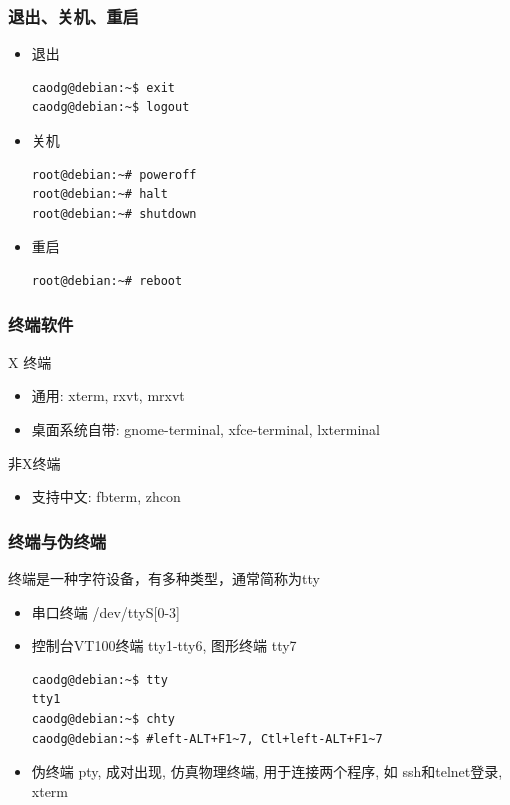 \documentclass[compress]{beamer}
\begin{document}
\begin{frame}[containsverbatim]
\frametitle{退出、关机、重启}

\begin{itemize}

\item 退出

\begin{Verbatim}
caodg@debian:~$ exit
caodg@debian:~$ logout
\end{Verbatim}

\item 关机

\begin{Verbatim}
root@debian:~# poweroff
root@debian:~# halt
root@debian:~# shutdown
\end{Verbatim}

\item 重启

\begin{Verbatim}
root@debian:~# reboot
\end{Verbatim}
\end{itemize}

\end{frame}


\begin{frame}[containsverbatim]
\frametitle{终端软件}
\noindent X 终端
\begin{itemize}
    \item 通用: xterm, rxvt, mrxvt
    \item 桌面系统自带: gnome-terminal, xfce-terminal, lxterminal
\end{itemize}
\noindent 非X终端
\begin{itemize}
    \item 支持中文: fbterm, zhcon
\end{itemize}

\end{frame}

\begin{frame}[containsverbatim]
    \frametitle{终端与伪终端}
    \noindent 终端是一种字符设备，有多种类型，通常简称为tty
    \begin{itemize}
        \item 串口终端 /dev/ttyS[0-3]
        \item 控制台VT100终端 tty1-tty6, 图形终端 tty7
\begin{Verbatim}
caodg@debian:~$ tty
tty1
caodg@debian:~$ chty 
caodg@debian:~$ #left-ALT+F1~7, Ctl+left-ALT+F1~7
\end{Verbatim}
\item 伪终端 pty, 成对出现, 仿真物理终端, 用于连接两个程序, 如 ssh和telnet登录,
    xterm
\end{itemize}
\end{frame}
\end{document}
